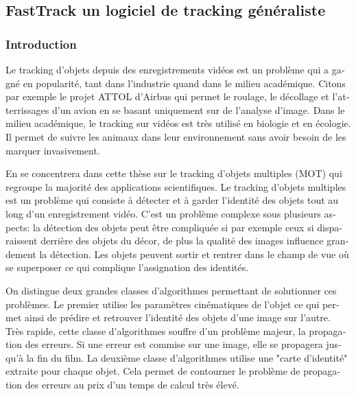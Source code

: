 \begin{otherlanguage}{french}
\subsubsection*{}
\subsection*{FastTrack un logiciel de tracking généraliste}
\subsubsection*{Introduction}
Le tracking d'objets depuis des enregistrements vidéos est un problème qui a gagné en popularité, tant dans l'industrie quand dans le milieu académique. Citons par exemple le projet ATTOL d'Airbus qui permet le roulage, le décollage et l'atterrissages d'un avion en se basant uniquement sur de l'analyse d'image. Dans le milieu académique, le tracking sur vidéos est très utilisé en biologie et en écologie. Il permet de suivre les animaux dans leur environnement sans avoir besoin de les marquer invasivement.

En se concentrera dans cette thèse sur le tracking d'objets multiples (MOT) qui regroupe la majorité des applications scientifiques. Le tracking d'objets multiples est un problème qui consiste à détecter et à garder l'identité des objets tout au long d'un enregistrement vidéo. C'est un problème complexe sous plusieurs aspects: la détection des objets peut être compliquée si par exemple ceux si disparaissent derrière des objets du décor, de plus la qualité des images influence grandement la détection. Les objets peuvent sortir et rentrer dans le champ de vue où se superposer ce qui complique l'assignation des identités.

On distingue deux grandes classes d'algorithmes permettant de solutionner ces problèmes. Le premier utilise les paramètres cinématiques de l'objet ce qui permet ainsi de prédire et retrouver l'identité des objets d'une image sur l'autre. Très rapide, cette classe d'algorithmes souffre d'un problème majeur, la propagation des erreurs. Si une erreur est commise sur une image, elle se propagera jusqu'à la fin du film. La deuxième classe d'algorithmes utilise une "carte d'identité" extraite pour chaque objet. Cela permet de contourner le problème de propagation des erreurs au prix d'un temps de calcul très élevé.


\end{otherlanguage}
